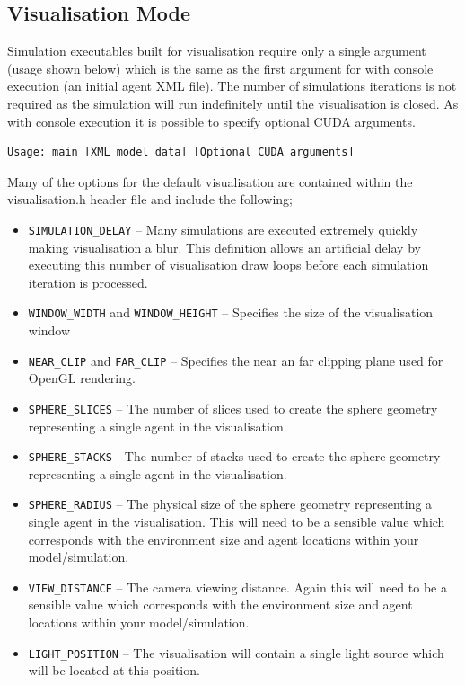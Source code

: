 \documentclass[11pt, a4paper, onecolumn, oneside]{report}
\begin{document}
\subsection{Visualisation Mode}
\label{sec:452}

Simulation executables built for visualisation require only a single argument (usage shown below) which is the same as the first argument for with console execution (an initial agent XML file).
The number of simulations iterations is not required as the simulation will run indefinitely until the visualisation is closed.
As with console execution it is possible to specify optional CUDA arguments.

\begin{verbatim}
Usage: main [XML model data] [Optional CUDA arguments]
\end{verbatim}

Many of the options for the default visualisation are contained within the visualisation.h header file and include the following;

\begin{itemize}
    \item \verb|SIMULATION_DELAY| -- Many simulations are executed extremely quickly making visualisation a blur.
        This definition allows an artificial delay by executing this number of visualisation draw loops before each simulation iteration is processed.
    \item \verb|WINDOW_WIDTH| and \verb|WINDOW_HEIGHT| -- Specifies the size of the visualisation window 
    \item \verb|NEAR_CLIP| and \verb|FAR_CLIP| -- Specifies the near an far clipping plane used for OpenGL rendering.
    \item \verb|SPHERE_SLICES| -- The number of slices used to create the sphere geometry representing a single agent in the visualisation.
    \item \verb|SPHERE_STACKS| - The number of stacks used to create the sphere geometry representing a single agent in the visualisation.
    \item \verb|SPHERE_RADIUS| -- The physical size of the sphere geometry representing a single agent in the visualisation.
        This will need to be a sensible value which corresponds with the environment size and agent locations within your model/simulation.
    \item \verb|VIEW_DISTANCE| -- The camera viewing distance.
        Again this will need to be a sensible value which corresponds with the environment size and agent locations within your model/simulation.
    \item \verb|LIGHT_POSITION| -- The visualisation will contain a single light source which will be located at this position.
\end{itemize}
\end{document}
